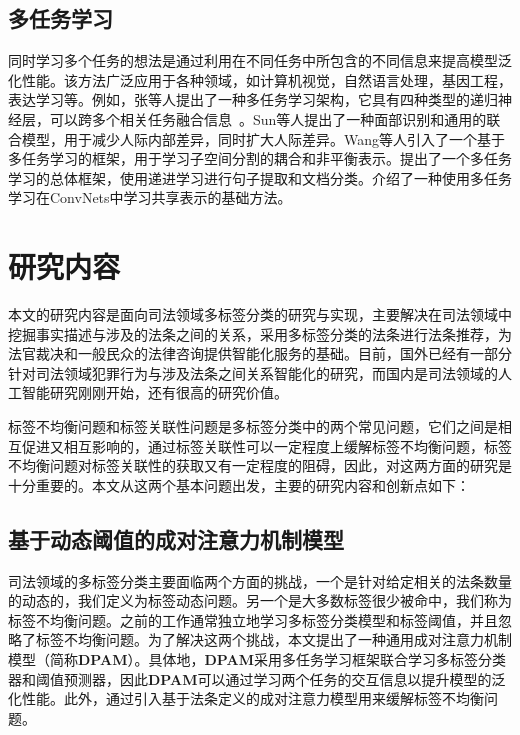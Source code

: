 \subsection{多任务学习}
同时学习多个任务的想法是通过利用在不同任务中所包含的不同信息来提高模型泛化性能。该方法广泛应用于各种领域，如计算机视觉\cite{Torralba2007Sharing, Yim2015Rotating, Zhang2013Robust}，自然语言处理\cite{Liu2017Adversarial, Glorot2011Domain, collobert2008unified, Liu2015Representation, luong2015multi}，基因工程\cite{Dong2014Inferring, Zhong2013User}，表达学习\cite{argyriou2007multi, Kang2011Learning, Zhang2010Probabilistic}等。例如，张等人提出了一种多任务学习架构，它具有四种类型的递归神经层，可以跨多个相关任务融合信息~\cite{Zhang2017A}。Sun等人提出了一种面部识别和通用的联合模型，用于减少人际内部差异，同时扩大人际差异\cite{Sun2014Deep}。Wang等人引入了一个基于多任务学习的框架，用于学习子空间分割的耦合和非平衡表示\cite{Wang2015Multi}。提出了一个多任务学习的总体框架，使用递进学习进行句子提取和文档分类\cite{Masaru2017Masaru}。介绍了一种使用多任务学习在ConvNets中学习共享表示的基础方法。

\section{研究内容}
本文的研究内容是面向司法领域多标签分类的研究与实现，主要解决在司法领域中挖掘事实描述与涉及的法条之间的关系，采用多标签分类的法条进行法条推荐，为法官裁决和一般民众的法律咨询提供智能化服务的基础。目前，国外已经有一部分针对司法领域犯罪行为与涉及法条之间关系智能化的研究，而国内是司法领域的人工智能研究刚刚开始，还有很高的研究价值。

标签不均衡问题和标签关联性问题是多标签分类中的两个常见问题，它们之间是相互促进又相互影响的，通过标签关联性可以一定程度上缓解标签不均衡问题，标签不均衡问题对标签关联性的获取又有一定程度的阻碍，因此，对这两方面的研究是十分重要的。本文从这两个基本问题出发，主要的研究内容和创新点如下：

\subsection{基于动态阈值的成对注意力机制模型}
司法领域的多标签分类主要面临两个方面的挑战，一个是针对给定相关的法条数量的动态的，我们定义为标签动态问题。另一个是大多数标签很少被命中，我们称为标签不均衡问题。之前的工作通常独立地学习多标签分类模型和标签阈值，并且忽略了标签不均衡问题。为了解决这两个挑战，本文提出了一种通用成对注意力机制模型（简称\textbf{DPAM}）。具体地，\textbf{DPAM}采用多任务学习框架联合学习多标签分类器和阈值预测器，因此\textbf{DPAM}可以通过学习两个任务的交互信息以提升模型的泛化性能。此外，通过引入基于法条定义的成对注意力模型用来缓解标签不均衡问题。
